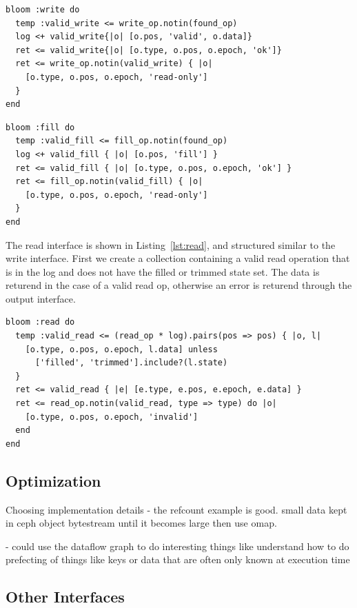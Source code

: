 \documentclass[10pt,twocolumn]{article}
\begin{document}
\begin{lstlisting}[caption={Write}, label=lst:write]
bloom :write do
  temp :valid_write <= write_op.notin(found_op)
  log <+ valid_write{|o| [o.pos, 'valid', o.data]}
  ret <= valid_write{|o| [o.type, o.pos, o.epoch, 'ok']}
  ret <= write_op.notin(valid_write) { |o|
    [o.type, o.pos, o.epoch, 'read-only']
  }
end
\end{lstlisting}

\begin{lstlisting}[caption={Fill}, label=lst:fill]
bloom :fill do
  temp :valid_fill <= fill_op.notin(found_op)
  log <+ valid_fill { |o| [o.pos, 'fill'] }
  ret <= valid_fill { |o| [o.type, o.pos, o.epoch, 'ok'] }
  ret <= fill_op.notin(valid_fill) { |o|
    [o.type, o.pos, o.epoch, 'read-only']
  }
end
\end{lstlisting}

The read interface is shown in Listing~\ref{lst:read}, and structured similar
to the write interface. First we create a collection containing a valid read
operation that is in the log and does not have the filled or trimmed state set.
The data is returend in the case of a valid read op, otherwise an error is
returend through the output interface.

\begin{lstlisting}[caption={Read}, label=lst:read]
bloom :read do
  temp :valid_read <= (read_op * log).pairs(pos => pos) { |o, l|
    [o.type, o.pos, o.epoch, l.data] unless
      ['filled', 'trimmed'].include?(l.state)
  }
  ret <= valid_read { |e| [e.type, e.pos, e.epoch, e.data] }
  ret <= read_op.notin(valid_read, type => type) do |o|
    [o.type, o.pos, o.epoch, 'invalid']
  end
end
\end{lstlisting}

\subsection{Optimization}

Choosing implementation details
  - the refcount example is good. small data kept in ceph object bytestream
until it becomes large then use omap.

  - could use the dataflow graph to do interesting things like understand how
  to do prefecting of things like keys or data that are often only known at
  execution time

\subsection{Other Interfaces}
\end{document}
